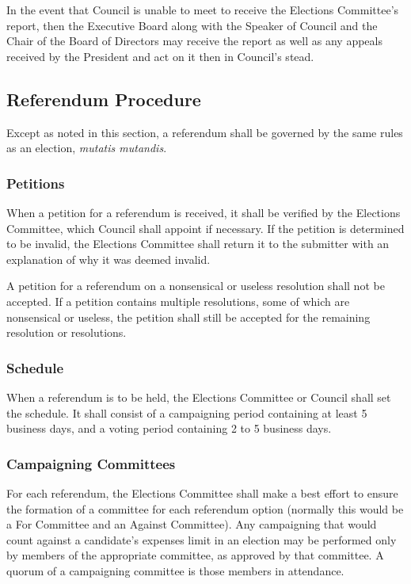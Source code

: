 In the event that Council is unable to meet to receive the Elections Committee's report, then the Executive Board along with the Speaker of Council and the Chair of the Board of Directors  may receive the report as well as any appeals received by the President and act on it then in Council's stead.

\subsection{Referendum Procedure}
Except as noted in this section, a referendum shall be governed by the same rules as an election, \emph{mutatis mutandis}.

\subsubsection{Petitions}
When a petition for a referendum is received, it shall be verified by the Elections Committee, which Council shall appoint if necessary.
If the petition is determined to be invalid, the Elections Committee shall return it to the submitter with an explanation of why it was deemed invalid.

A petition for a referendum on a nonsensical or useless resolution shall not be accepted.
If a petition contains multiple resolutions, some of which are nonsensical or useless, the petition shall still be accepted for the remaining resolution or resolutions.

\subsubsection{Schedule}
When a referendum is to be held, the Elections Committee or Council shall set the schedule.
It shall consist of a campaigning period containing at least 5 business days, and a voting period containing 2 to 5 business days.

\subsubsection{Campaigning Committees}
For each referendum, the Elections Committee shall make a best effort to ensure the formation of a committee for each referendum option (normally this would be a For Committee and an Against Committee).
Any campaigning that would count against a candidate's expenses limit in an election may be performed only by members of the appropriate committee, as approved by that committee.
A quorum of a campaigning committee is those members in attendance.

